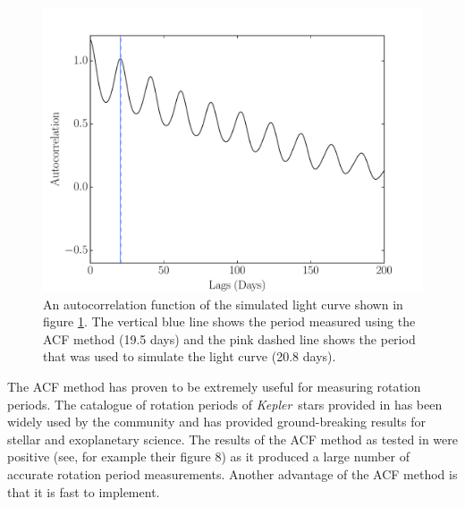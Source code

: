 \documentclass[useAMS, usenatbib, preprint, 12pt]{aastex}
\newcommand{\Kepler}{{\it Kepler}}
\begin{document}
\begin{figure}
\begin{center}
\includegraphics[width=6in, clip=true]{figures/demo_ACF.pdf}
\caption[ACF of a simulated light curve.]
{An autocorrelation function of the simulated light curve shown in figure
\ref{fig:demo_lc}.
The vertical blue line shows the period measured using the ACF method (19.5
days) and the pink dashed line shows the period that was used to simulate the
light curve (20.8 days).}
\label{fig:demo_lc}
\end{center}
\end{figure}

The ACF method has proven to be extremely useful for measuring rotation
periods.
The catalogue of rotation periods of \Kepler\ stars provided in
\citet{Mcquillan2013} has been widely used by the community and has provided
ground-breaking results for stellar and exoplanetary science.
The results of the ACF method as tested in \citet{Aigrain2015} were positive
(see, for example their figure 8) as it produced a large number of accurate
rotation period measurements.
Another advantage of the ACF method is that it is fast to implement.
\end{document}
